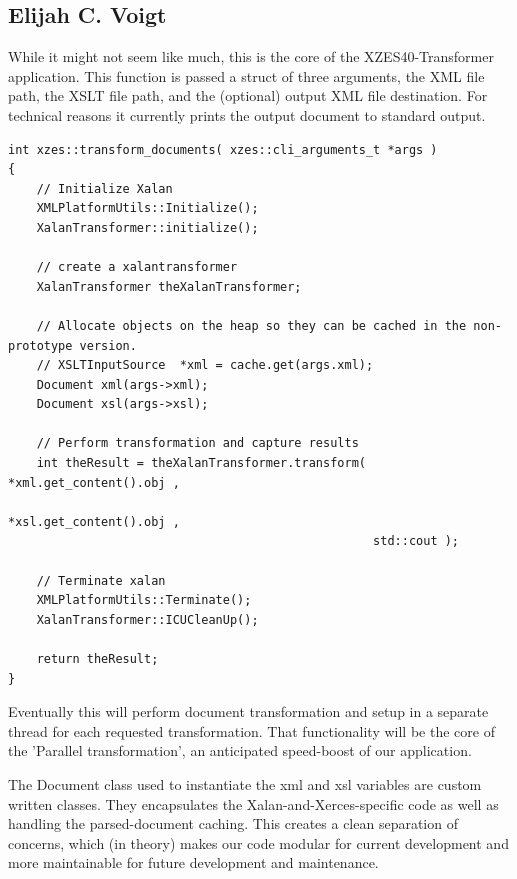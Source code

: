 \subsection{Elijah C. Voigt}

While it might not seem like much, this is the core of the XZES40-Transformer application.
This function is passed a struct of three arguments, the XML file path, the XSLT file path, and the (optional) output XML file destination.
For technical reasons it currently prints the output document to standard output.

\begin{lstlisting}
int xzes::transform_documents( xzes::cli_arguments_t *args )
{
    // Initialize Xalan
    XMLPlatformUtils::Initialize();
    XalanTransformer::initialize();

    // create a xalantransformer
    XalanTransformer theXalanTransformer;

    // Allocate objects on the heap so they can be cached in the non-prototype version.
    // XSLTInputSource  *xml = cache.get(args.xml);
    Document xml(args->xml);
    Document xsl(args->xsl);

    // Perform transformation and capture results
    int theResult = theXalanTransformer.transform( *xml.get_content().obj ,
                                                   *xsl.get_content().obj ,
                                                   std::cout );

    // Terminate xalan
    XMLPlatformUtils::Terminate();
    XalanTransformer::ICUCleanUp();

    return theResult;
}
\end{lstlisting}

Eventually this will perform document transformation and setup in a separate thread for each requested transformation.
That functionality will be the core of the 'Parallel transformation', an anticipated speed-boost of our application.

The Document class used to instantiate the xml and xsl variables are custom written classes.
They encapsulates the Xalan-and-Xerces-specific code as well as handling the parsed-document caching.
This creates a clean separation of concerns, which (in theory) makes our code modular for current development and more maintainable for future development and maintenance.

